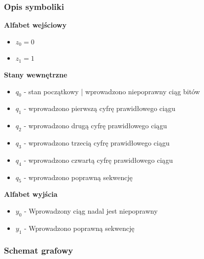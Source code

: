 \documentclass[a4paper,12pt]{extarticle}  %
\begin{document}
\subsubsection{Opis symboliki}
\textbf{Alfabet wejściowy}
\begin{itemize}
    \item $z_0 = 0$
    \item $z_1 = 1$
\end{itemize}
\textbf{Stany wewnętrzne}
\begin{itemize}
    \item $q_0$ - stan początkowy | wprowadzono niepoprawny ciąg bitów
    \item $q_1$ - wprowadzono pierwszą cyfrę prawidłowego ciągu
    \item $q_2$ - wprowadzono drugą cyfrę prawidłowego ciągu
    \item $q_3$ - wprowadzono trzecią cyfrę prawidłowego ciągu
    \item $q_4$ - wprowadzono czwartą cyfrę prawidłowego ciągu
    \item $q_5$ - wprowadzono poprawną sekwencję
\end{itemize}
\textbf{Alfabet wyjścia}
\begin{itemize}
    \item $y_0$ - Wprowadzony ciąg nadal jest niepoprawny
    \item $y_1$ - Wprowadzono poprawną sekwencję
\end{itemize}
\subsubsection{Schemat grafowy}
\begin{figure}[H]
	\centering
\end{figure}
\end{document}
